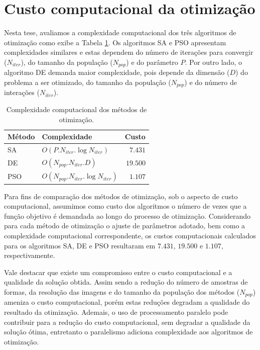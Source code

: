 \section{Custo computacional da otimização \label{sec:comp_cost}}


 Nesta tese,  avaliamos a complexidade computacional dos três algoritmos de otimização como exibe a Tabela \ref{tbl:complexity}.  Os algoritmos \ac{SA} e \ac{PSO} apresentam complexidades similares e estas dependem do número de iterações para convergir ($N_{iter}$), do tamanho da população  ($N_{pop}$) e do parâmetro $P$.  Por outro lado, o algoritmo \ac{DE} demanda maior complexidade, pois depende da dimensão ($D$) do problema a ser otimizado, do tamanho da população ($N_{pop}$) e do número de interações ($N_{iter}$).

\begin{table}[h!]
\centering
\caption{Complexidade computacional dos métodos de otimização.}
\label{tbl:complexity}
  \begin{tabular}{llr}
  \toprule[1.5pt]
 Método & Complexidade& Custo\\
 \midrule
   \ac{SA}  & $O(P.N_{iter}.\log{N_{iter}})$ & $7.431$    \\
   \ac{DE}  & $O(N_{pop}.N_{iter}.D)$ & $19.500$  \\
   \ac{PSO}&  $O(N_{pop}.N_{iter}.\log{N_{iter}})$ & $1.107$\\
  \bottomrule[1.5pt]
  \end{tabular}
\end{table}

Para fins de comparação dos métodos de otimização, sob o aspecto de custo computacional, assumimos como custo dos algoritmos o número de vezes que a função objetivo é demandada ao longo do processo de otimização. Considerando para cada método de otimização o ajuste de parâmetros adotado, bem como a complexidade computacional correspondente, os custos computacionais calculados para os algoritmos \ac{SA}, \ac{DE} e \ac{PSO} resultaram em $7.431$, $19.500$ e $1.107$, respectivamente. 

Vale destacar que existe um compromisso entre o custo computacional e a qualidade da solução obtida. Assim sendo a redução do número de amostras de formas, da resolução das imagens e do tamanho da população dos métodos ($N_{pop}$) ameniza o custo computacional, porém estas reduções degradam a qualidade do resultado da otimização. Ademais, o uso de processamento paralelo pode contribuir para a redução do custo computacional, sem degradar a qualidade da solução ótima, entretanto o paralelismo adiciona complexidade aos algoritmos de otimização. 



